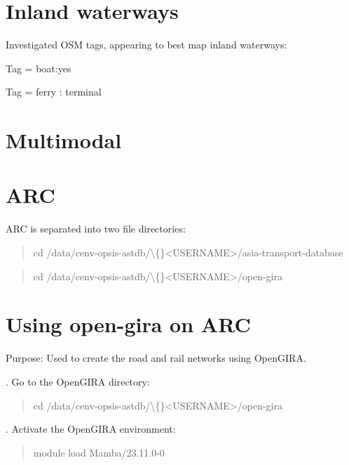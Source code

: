 \documentclass[11pt,a4paper]{article}
\begin{document}
\section{Inland waterways}

Investigated OSM tags, appearing to best map inland waterways:\par

Tag = boat:yes\par

Tag = ferry : terminal\par


\section{Multimodal}



\section{ARC}

ARC is separated into two file directories:\par

\begin{quote}\ttfamily cd /data/cenv-opsis-astdb/\textbackslash\{\}<USERNAME>/asia-transport-database\end{quote}

\begin{quote}\ttfamily cd /data/cenv-opsis-astdb/\textbackslash\{\}<USERNAME>/open-gira\end{quote}



\section{Using open-gira on ARC}

Purpose: Used to create the road and rail networks using OpenGIRA.\par

. Go to the OpenGIRA directory:

\begin{quote}\ttfamily cd /data/cenv-opsis-astdb/\textbackslash\{\}<USERNAME>/open-gira\end{quote}

. Activate the OpenGIRA environment:

\begin{quote}\ttfamily module load Mamba/23.11.0-0\end{quote}
\end{document}
